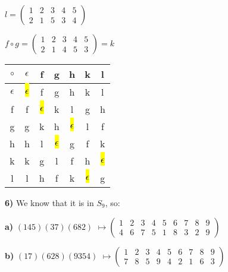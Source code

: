\documentclass{article}
\begin{document}
\medskip

$l=(\begin{smallmatrix}
1 & 2 & 3 & 4 & 5 \\
2 & 1 & 5 & 3 & 4
\end{smallmatrix})$

\medskip


$f \circ g=(\begin{smallmatrix}
1 & 2 & 3 & 4 & 5 \\
2 & 1 & 4 & 5 & 3
\end{smallmatrix})=k$

\begin{table}[ht]
	\begin{tabular}{|c| |c| |c| |c| |c| c| |c|}

	\hline
	$\circ$ & $\epsilon$ & f & g & h & k & l \\
	
	\hline
	$\epsilon$ & \hl{$\epsilon$} & f & g & h & k & l \\
	
	\hline
	f & f & \hl{$\epsilon$} & k & l & g & h \\
	
	\hline
	g & g & k & h & \hl{$\epsilon$} & l & f \\
	
	\hline
	h & h & l & \hl{$\epsilon$} & g & f & k \\
	
	\hline
	k & k & g & l & f & h & \hl{$\epsilon$} \\
	
	\hline
	l & l & h & f & k & \hl{$\epsilon$} & g 
	
	\end{tabular}
\end{table}
	

\newpage

\textbf{6)} We know that it is in $S_9$, so: 

\bigskip


\hspace{.3in}\textbf{a)}
$(145)(37)(682)$             $\mapsto (\begin{smallmatrix}
					1 & 2 & 3 & 4 & 5 & 6 & 7 & 8 & 9 \\
					4 & 6 & 7 & 5 & 1 & 8 & 3 & 2 & 9
					\end{smallmatrix})$ 
					
					\bigskip
					
\hspace{.3in}\textbf{b)}
$(17)(628)(9354)$             $\mapsto (\begin{smallmatrix}
					1 & 2 & 3 & 4 & 5 & 6 & 7 & 8 & 9\\
					7 & 8  & 5 & 9 & 4  & 2 & 1 & 6 & 3
					\end{smallmatrix})$ 
					
\end{document}
